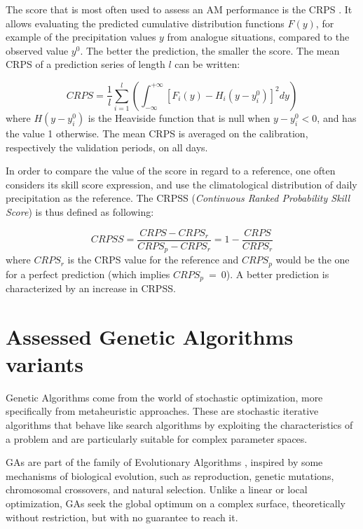 \documentclass{ametsoc}
\begin{document}
The score that is most often used to assess an AM performance is the CRPS \citep[Continuous Ranked Probability Score,][]{Brown1974, Matheson1976, Hersbach2000}. It allows evaluating the predicted cumulative distribution functions $F(y)$, for example of the precipitation values $y$ from analogue situations, compared to the observed value $y^{0}$. The better the prediction, the smaller the score. The mean CRPS of a prediction series of length $l$ can be written:

\begin{equation}
\label{eq:CRPS}
CRPS = \frac{1}{l} \sum_{i=1}^{l} \left(  \int_{-\infty}^{+\infty} \left[ F_{i}(y)-H_{i}(y-y_{i}^{0})\right]^{2} dy \right) 
\end{equation}
where $H(y-y_{i}^{0})$ is the Heaviside function that is null when $y-y_{i}^{0}<0$, and has the value 1 otherwise. The mean CRPS is averaged on the calibration, respectively the validation periods, on all days.

In order to compare the value of the score in regard to a reference, one often considers its skill score expression, and use the climatological distribution of daily precipitation as the reference. The CRPSS (\textit{Continuous Ranked Probability Skill Score}) is thus defined as following:

\begin{equation}
\label{eq:CRPSS}
CRPSS = \frac{CRPS-CRPS_{r}}{CRPS_{p}-CRPS_{r}} = 1-\frac{CRPS}{CRPS_{r}}
\end{equation}
where $CRPS_{r}$ is the CRPS value for the reference and $CRPS_{p}$ would be the one for a perfect prediction (which implies $CRPS_{p}~=~0$). A better prediction is characterized by an increase in CRPSS.


\section{Assessed Genetic Algorithms variants}
\label{sec:gas}

Genetic Algorithms \citep[GAs,][]{Holland1992b, Goldberg1989} come from the world of stochastic optimization, more specifically from metaheuristic approaches. These are stochastic iterative algorithms that behave like search algorithms by exploiting the characteristics of a problem and are particularly suitable for complex parameter spaces.

GAs are part of the family of Evolutionary Algorithms \citep{Back1993b, Schwefel1993}, inspired by some mechanisms of biological evolution, such as reproduction, genetic mutations, chromosomal crossovers, and natural selection. Unlike a linear or local optimization, GAs seek the global optimum on a complex surface, theoretically without restriction, but with no guarantee to reach it.
\end{document}
